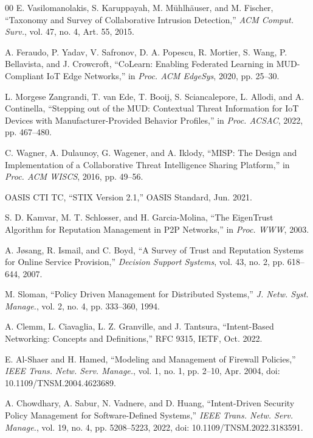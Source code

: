 \documentclass[journal]{IEEEtran}
\theoremstyle{definition}
\begin{document}
\begin{thebibliography}{00}
 E. Vasilomanolakis, S. Karuppayah,
M. M\"uhlh\"auser, and M. Fischer, ``Taxonomy and Survey of Collaborative Intrusion
Detection,'' \emph{ACM Comput. Surv.}, vol. 47, no. 4, Art. 55, 2015.

 A. Feraudo, P. Yadav, V. Safronov, D. A. Popescu, R. Mortier,
S. Wang, P. Bellavista, and J. Crowcroft, ``CoLearn: Enabling Federated Learning
in MUD-Compliant IoT Edge Networks,'' in \emph{Proc. ACM EdgeSys}, 2020,
pp. 25--30.

 L. Morgese Zangrandi, T. van Ede, T. Booij,
S. Sciancalepore, L. Allodi, and A. Continella, ``Stepping out of the MUD:
Contextual Threat Information for IoT Devices with Manufacturer-Provided
Behavior Profiles,'' in \emph{Proc. ACSAC}, 2022, pp. 467--480.

 C. Wagner, A. Dulaunoy, G. Wagener, and A. Iklody, ``MISP: The
Design and Implementation of a Collaborative Threat Intelligence Sharing Platform,'' in
\emph{Proc. ACM WISCS}, 2016, pp. 49--56.

 OASIS CTI TC, ``STIX Version 2.1,'' OASIS Standard, Jun. 2021.

 S. D. Kamvar, M. T. Schlosser, and H. Garcia-Molina, ``The EigenTrust
Algorithm for Reputation Management in P2P Networks,'' in \emph{Proc. WWW}, 2003.

 A. J\o{}sang, R. Ismail, and C. Boyd, ``A Survey of Trust and
Reputation Systems for Online Service Provision,'' \emph{Decision Support Systems}, vol.
43, no. 2, pp. 618--644, 2007.

 M. Sloman, ``Policy Driven Management for Distributed Systems,'' \emph{J.
Netw. Syst. Manage.}, vol. 2, no. 4, pp. 333--360, 1994.

 A. Clemm, L. Ciavaglia, L. Z. Granville, and J. Tantsura,
``Intent-Based Networking: Concepts and Definitions,'' RFC 9315, IETF, Oct. 2022.

 E. Al-Shaer and H. Hamed, ``Modeling and Management of
Firewall Policies,'' \emph{IEEE Trans. Netw. Serv. Manage.}, vol. 1, no. 1, pp. 2--10,
Apr. 2004, doi: 10.1109/TNSM.2004.4623689.

 A. Chowdhary, A. Sabur, N. Vadnere, and D. Huang,
``Intent-Driven Security Policy Management for Software-Defined Systems,''
\emph{IEEE Trans. Netw. Serv. Manage.}, vol. 19, no. 4, pp. 5208--5223, 2022,
doi: 10.1109/TNSM.2022.3183591.


\end{thebibliography}
\end{document}
